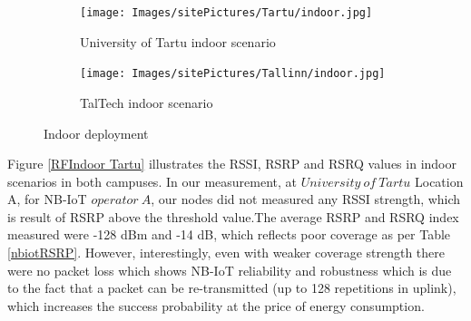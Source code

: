 \documentclass[12pt]{article}
\begin{document}
\begin{figure}[h!]
\centering
\begin{subfigure}[t]{0.42 \linewidth}
  \centering
  \texttt{[image: Images/sitePictures/Tartu/indoor.jpg]}
  \caption{University of Tartu indoor scenario}
  \end{subfigure}
  
  \begin{subfigure}[t]{0.42\linewidth}
    \centering
    \texttt{[image: Images/sitePictures/Tallinn/indoor.jpg]}
    \caption{TalTech indoor scenario}
  \end{subfigure}
   
    \caption{Indoor deployment}
    \label{fig:Indoor deployment}
\end{figure}

Figure \ref{RFIndoor Tartu} illustrates the RSSI, RSRP and RSRQ values in indoor scenarios in both campuses. In our measurement, at $University\ of\ Tartu$ Location A, for NB-IoT $operator\ A$, our nodes did not measured any RSSI strength, which is result of RSRP above the threshold value.The average RSRP and RSRQ index measured were -128 dBm and -14 dB, which reflects poor coverage as per Table \ref{nbiotRSRP}. However, interestingly, even with weaker coverage strength there were no packet loss which shows NB-IoT reliability and robustness which is due to the fact that a packet can be re-transmitted (up to 128 repetitions in uplink), which increases the success probability at the price of energy consumption.
\end{document}
